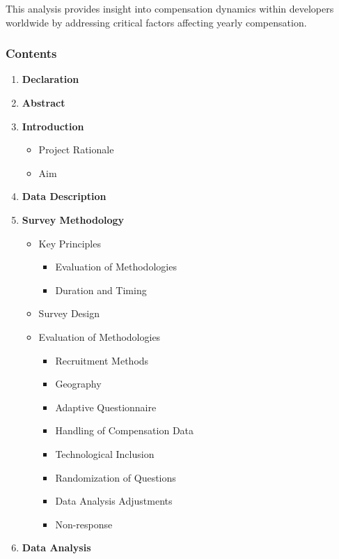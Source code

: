 \documentclass[
  12pt,
]{article}
\providecommand{\tightlist}{%
  \setlength{\itemsep}{0pt}\setlength{\parskip}{0pt}}
\begin{document}
This analysis provides insight into compensation dynamics within
developers worldwide by addressing critical factors affecting yearly
compensation.

\hypertarget{contents}{%
\subsubsection{Contents}\label{contents}}

\begin{enumerate}
\def\labelenumi{\arabic{enumi}.}
\tightlist
\item
  \textbf{Declaration}
\item
  \textbf{Abstract}
\item
  \textbf{Introduction}

  \begin{itemize}
  \tightlist
  \item
    Project Rationale
  \item
    Aim
  \end{itemize}
\item
  \textbf{Data Description}
\item
  \textbf{Survey Methodology}

  \begin{itemize}
  \tightlist
  \item
    Key Principles

    \begin{itemize}
    \tightlist
    \item
      Evaluation of Methodologies
    \item
      Duration and Timing
    \end{itemize}
  \item
    Survey Design
  \item
    Evaluation of Methodologies

    \begin{itemize}
    \tightlist
    \item
      Recruitment Methods
    \item
      Geography
    \item
      Adaptive Questionnaire
    \item
      Handling of Compensation Data
    \item
      Technological Inclusion
    \item
      Randomization of Questions
    \item
      Data Analysis Adjustments
    \item
      Non-response
    \end{itemize}
  \end{itemize}
\item
  \textbf{Data Analysis}


\end{enumerate}
\end{document}
